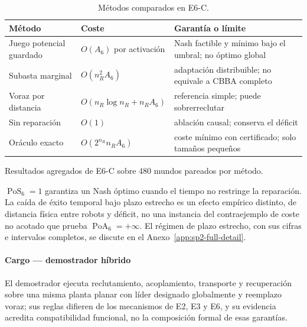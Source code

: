 \begin{table}[!htbp]
  \centering
  \caption{Métodos comparados en E6-C.}
  \label{tab:sp2-compact-e6-methods}
  \fontsize{7.6}{8.6}\selectfont
  \setlength{\tabcolsep}{2.2pt}
  \renewcommand{\arraystretch}{1.08}
  \begin{tabularx}{\textwidth}{>{\raggedright\arraybackslash}p{3.0cm} >{\raggedright\arraybackslash}p{2.0cm} Y}
    \toprule
    Método & Coste & Garantía o límite \\
    \midrule
    Juego potencial guardado & $O(A_6)$ por activación & Nash factible y mínimo bajo el umbral; no óptimo global \\
    Subasta marginal & $O(n_R^2A_6)$ & adaptación distribuible; no equivale a CBBA completo \\
    Voraz por distancia & $O(n_R\log n_R+n_RA_6)$ & referencia simple; puede sobrerreclutar \\
    Sin reparación & $O(1)$ & ablación causal; conserva el déficit \\
    Oráculo exacto & $O(2^{n_R}n_RA_6)$ & coste mínimo con certificado; solo tamaños pequeños \\
    \bottomrule
  \end{tabularx}
\end{table}

\begin{table}[!htbp]
  \centering
  \caption{Resultados agregados de E6-C sobre 480 mundos pareados por método.}
  \label{tab:sp2-compact-e6-results}
  \scriptsize
  \resizebox{\textwidth}{!}{}
  \viuownsource
\end{table}

$\operatorname{PoS}_6=1$ garantiza un Nash óptimo cuando el tiempo no
restringe la reparación. La caída de éxito temporal bajo plazo estrecho es un
efecto empírico distinto, de distancia física entre robots y déficit, no una
instancia del contraejemplo de coste no acotado que prueba
$\operatorname{PoA}_6=+\infty$. El régimen de plazo estrecho, con sus cifras
e intervalos completos, se discute en el Anexo~\ref{app:sp2-full-detail}.

\paragraph{Cargo --- demostrador híbrido}
El demostrador ejecuta reclutamiento, acoplamiento, transporte y recuperación
sobre una misma planta planar con líder designado globalmente y reemplazo
voraz; sus reglas difieren de los mecanismos de E2, E3 y E6, y su evidencia
acredita compatibilidad funcional, no la composición formal de esas garantías.

